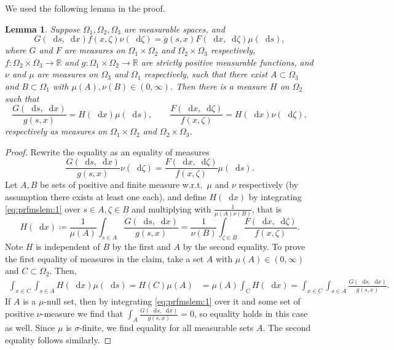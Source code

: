 \documentclass[reqno,draft]{amsart}
\numberwithin{equation}{section}
\theoremstyle{plain}
\newtheorem{lemma}[theorem]{Lemma}
\theoremstyle{remark}
\newcommand{\R}{\mathbb{R}} %
\newcommand*\diff{\mathop{}\!\mathrm{d}}
\begin{document}
We used the following lemma in the proof.
\begin{lemma}\label{lem:prfunique:1}
    Suppose $\Omega_1,\Omega_2,\Omega_3$ are measurable spaces, and \[
        G(\diff s,\diff x) f(x, \zeta) \nu(\diff \zeta) = g(s,x) F(\diff x,\diff \zeta) \mu(\diff s),
        \] where $G$ and $F$ are measures on $\Omega_1\times \Omega_2$ and $\Omega_2\times \Omega_3$ respectively, $f\colon \Omega_2\times \Omega_3\to \R$ and $g\colon \Omega_1\times \Omega_2\to \R$ are strictly positive measurable functions, and $\nu$ and $\mu$ are measures on $\Omega_3$ and $\Omega_1$ respectively, such that there exist $A \subset \Omega_3$ and $B\subset \Omega_1$ with $\mu(A), \nu(B)\in (0,\infty)$. Then there is a measure $H$ on $\Omega_2$ such that \[
        \frac{G(\diff s,\diff x)}{g(s,x)} = H(\diff x) \mu(\diff s),\qquad \frac{F(\diff x,\diff \zeta)}{f(x,\zeta)} = H(\diff x) \nu(\diff \zeta),
    \] respectively as measures on $\Omega_1\times \Omega_2$ and $\Omega_2\times \Omega_3$. %
\end{lemma}
\begin{proof}
    Rewrite the equality as an equality of measures
    \begin{equation}\label{eq:prfmslem:1}
        \frac{G(\diff s,\diff x)}{g(s,x)} \nu(\diff \zeta) = \frac{F(\diff x,\diff \zeta)}{f(x,\zeta)} \mu(\diff s).
    \end{equation}
    Let $A,B$ be sets of positive and finite measure w.r.t.\ $\mu$ and $\nu$ respectively (by assumption there exists at least one each), and define $H(\diff x)$ by integrating \cref{eq:prfmslem:1} over $s\in A,\zeta \in B$ and multiplying with $\frac{1}{\mu(A) \nu(B)}$, that is \[
        H(\diff x) \coloneqq \frac{1}{\mu(A)}\int_{s\in A} \frac{G(\diff s,\diff x)}{g(s,x)} = \frac{1}{\nu(B)} \int_{\zeta \in B} \frac{F(\diff x,\diff \zeta)}{f(x,\zeta)}.
    \] Note $H$ is independent of $B$ by the first and $A$ by the second equality. To prove the first equality of measures in the claim, take a set $A$ with $\mu(A) \in (0,\infty)$ and $C \subset \Omega_2$. Then,
    \begin{align*}
        \int_{x\in C} \int_{s\in A} H(\diff x) \mu(\diff s)
        = H(C) \mu(A)
        &= \mu(A) \int_C H(\diff x) = \int_{x\in C}\int_{s\in A} \frac{G(\diff s,\diff x)}{g(s,x)}.
    \end{align*}
    If $A$ is a $\mu$-null set, then by integrating \cref{eq:prfmslem:1} over it and some set of positive $\nu$-measure we find that $\int_A \frac{G(\diff s,\diff x)}{g(s,x)} = 0$, so equality holds in this case as well. Since $\mu$ is $\sigma$-finite, we find equality for all measurable sets $A$. The second equality follows similarly.
\end{proof}
\end{document}
